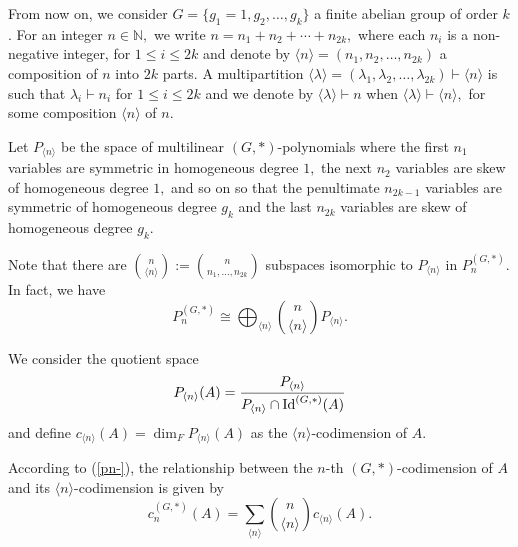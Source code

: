 \documentclass{amsart}
\newcommand{\IdG}{\ensuremath{\textnormal{Id}^{(G,\ast)}}}
\numberwithin{equation}{section}
\begin{document}
From now on, we consider $G=\{g_1=1,g_2,\ldots,g_k\}$ a finite abelian group of order $k$. For an integer $n \in \mathbb{N},$ we write $n=n_1+n_2+\cdots+n_{2k},$ where each $n_i$ is a non-negative integer, for $1\le i \le 2k$ and denote by $\langle n \rangle =(n_1, n_2, \ldots, n_{2k})$ a composition of $n$ into $2k$ parts. A multipartition $\langle \lambda \rangle=(\lambda_1, \lambda_2, \ldots, \lambda_{2k})\vdash \langle n \rangle$ is such that $\lambda_i\vdash n_i$ for $1 \le i\le 2k$ and we denote by $\langle \lambda \rangle \vdash n$ when $\langle \lambda \rangle \vdash \langle n \rangle,$ for some composition $\langle n \rangle$ of $n. $ 

Let $P_{\langle n \rangle}$ be the space of multilinear $(G,*)$-polynomials  where the first $n_1$ variables are symmetric in homogeneous degree $1,$ the next $n_2$ variables are skew of homogeneous degree $1,$ and so on so that the penultimate $n_{2k-1}$ variables are symmetric of homogeneous degree $g_k$ and the last $n_{2k}$ variables are skew of homogeneous degree $g_k.$ 

Note that there are
$\displaystyle\binom{n}{\langle n \rangle}:=\displaystyle\binom{n}{ n_1, \ldots, n_{2k} }$ subspaces isomorphic to $P_{\langle n \rangle}$ in $P_n^{(G,*)}$. In fact, we have
\begin{equation} \label{pn-}
P_n^{(G,*)} \cong \displaystyle \bigoplus_{\langle n \rangle } \displaystyle\binom{n}{\langle n \rangle} P_{\langle n \rangle} .
\end{equation}

We consider the quotient space $$P_{\langle n \rangle}(A) = \frac{P_{\langle n \rangle}}{P_{\langle n \rangle}\cap \IdG(A)}$$ and define $c_{\langle n \rangle}(A)=\dim_F P_{\langle n \rangle}(A)$ as the $\langle n \rangle $-codimension of $A$. 

According to (\ref{pn-}), the relationship between the $n$-th $(G,*)$-codimension of $A$ and its $\langle n \rangle$-codimension is given by
\begin{equation} \label{293-}
		c_n^{(G,*)}(A)= \underset{\langle n \rangle }{\sum} \displaystyle\binom{n}{\langle n \rangle } c_{\langle n \rangle}(A). 
	\end{equation}
\end{document}
